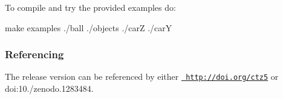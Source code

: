 To compile and try the provided examples do\+: \begin{DoxyVerb}make examples
./ball
./objects
./carZ
./carY
\end{DoxyVerb}


\subsubsection*{Referencing}

The release version can be referenced by either \href{http://doi.org/ctz5}{\texttt{ http\+://doi.\+org/ctz5}} or doi\+:10./zenodo.1283484. 